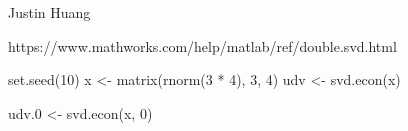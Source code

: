 \documentclass[a4paper]{book}
\begin{document}
%
\begin{Author}\relax
Justin Huang
\end{Author}
%
\begin{References}\relax
https://www.mathworks.com/help/matlab/ref/double.svd.html
\end{References}
%
\begin{SeeAlso}\relax
{}
\end{SeeAlso}
%
\begin{Examples}
\begin{ExampleCode}
set.seed(10)
x <- matrix(rnorm(3 * 4), 3, 4)
udv <- svd.econ(x)

udv.0 <- svd.econ(x, 0)
\end{ExampleCode}
\end{Examples}
\printindex{}
\end{document}
